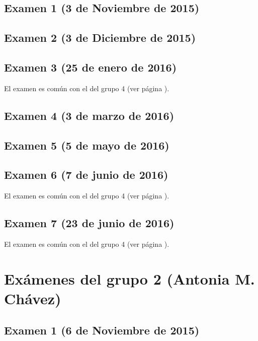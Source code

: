 \documentclass[a4paper,12pt,twoside]{book}
\begin{document}
\subsection{Examen 1 (3 de Noviembre de 2015)}
\subsection{Examen 2 (3 de Diciembre de 2015)}
\subsection{Examen 3 (25 de enero de 2016)}
El examen es común con el del grupo 4 (ver página \pageref{examen_15_16_4_3}).
\subsection{Examen 4 (3 de marzo de 2016)}
\subsection{Examen 5 (5 de mayo de 2016)}
\subsection{Examen 6 (7 de junio de 2016)} 
El examen es común con el del grupo 4 (ver página \pageref{examen_15_16_4_6}).
\subsection{Examen 7 (23 de junio de 2016)}
El examen es común con el del grupo 4 (ver página \pageref{examen_15_16_4_7}).

\section{Exámenes del grupo 2 (Antonia M. Chávez)}
\subsection{Examen 1 (6 de Noviembre de 2015)}
\end{document}
